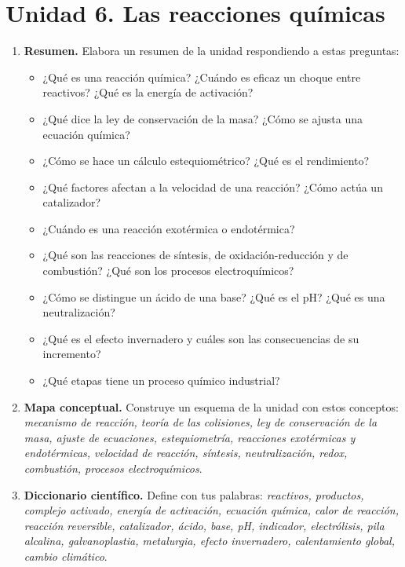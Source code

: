 \section{Unidad 6. Las reacciones químicas}

\begin{enumerate}[label=\numberballred]
    \item \textbf{Resumen.} Elabora un resumen de la unidad respondiendo a estas preguntas:
    \begin{itemize}
        \item ¿Qué es una reacción química? ¿Cuándo es eficaz un choque entre reactivos? ¿Qué es la energía de activación?
        \item ¿Qué dice la ley de conservación de la masa? ¿Cómo se ajusta una ecuación química?
        \item ¿Cómo se hace un cálculo estequiométrico? ¿Qué es el rendimiento?
        \item ¿Qué factores afectan a la velocidad de una reacción? ¿Cómo actúa un catalizador?
        \item ¿Cuándo es una reacción exotérmica o endotérmica?
        \item ¿Qué son las reacciones de síntesis, de oxidación-reducción y de combustión? ¿Qué son los procesos electroquímicos?
        \item ¿Cómo se distingue un ácido de una base? ¿Qué es el pH? ¿Qué es una neutralización?
        \item ¿Qué es el efecto invernadero y cuáles son las consecuencias de su incremento?
        \item ¿Qué etapas tiene un proceso químico industrial?
    \end{itemize}
    \item \textbf{Mapa conceptual.} Construye un esquema de la unidad con estos conceptos: \emph{mecanismo de reacción, teoría de las colisiones, ley de conservación de la masa, ajuste de ecuaciones, estequiometría, reacciones exotérmicas y endotérmicas, velocidad de reacción, síntesis, neutralización, redox, combustión, procesos electroquímicos}.
    \item \textbf{Diccionario científico.} Define con tus palabras: \emph{reactivos, productos, complejo activado, energía de activación, ecuación química, calor de reacción, reacción reversible, catalizador, ácido, base, pH, indicador, electrólisis, pila alcalina, galvanoplastia, metalurgia, efecto invernadero, calentamiento global, cambio climático}.
\end{enumerate}

